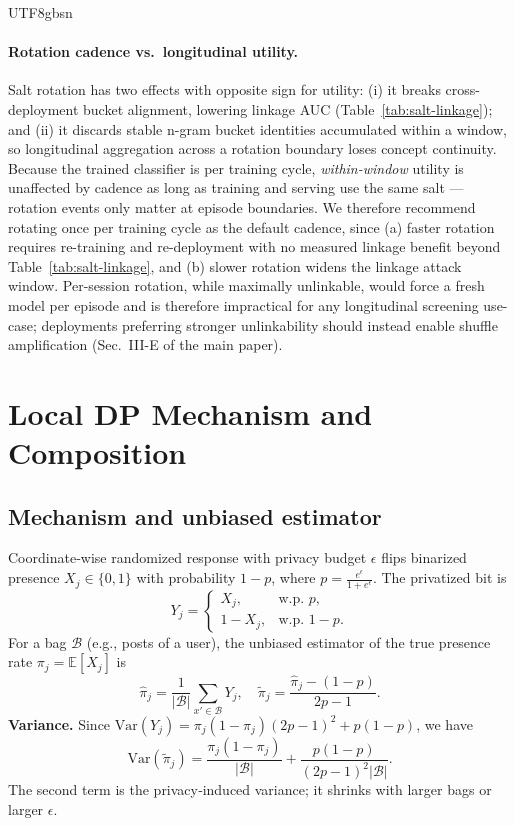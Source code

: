 \documentclass[acmsmall,natbib]{acmart}
\begin{document}
\begin{CJK*}{UTF8}{gbsn}
\paragraph{Rotation cadence vs.\ longitudinal utility.}
Salt rotation has two effects with opposite sign for utility: (i) it breaks cross-deployment bucket alignment, lowering linkage AUC (Table~\ref{tab:salt-linkage}); and (ii) it discards stable n-gram bucket identities accumulated within a window, so longitudinal aggregation across a rotation boundary loses concept continuity. Because the trained classifier is per training cycle, \emph{within-window} utility is unaffected by cadence as long as training and serving use the same salt — rotation events only matter at episode boundaries. We therefore recommend rotating once per training cycle as the default cadence, since (a) faster rotation requires re-training and re-deployment with no measured linkage benefit beyond Table~\ref{tab:salt-linkage}, and (b) slower rotation widens the linkage attack window. Per-session rotation, while maximally unlinkable, would force a fresh model per episode and is therefore impractical for any longitudinal screening use-case; deployments preferring stronger unlinkability should instead enable shuffle amplification (Sec.~III-E of the main paper).


\section{Local DP Mechanism and Composition}
\label{app:ldp}

\subsection{Mechanism and unbiased estimator}
Coordinate‑wise randomized response with privacy budget $\epsilon$ flips binarized presence $X_j \in \{0,1\}$ with probability $1-p$, where $p=\frac{e^{\epsilon}}{1+e^{\epsilon}}$. The privatized bit is
\[
Y_j=\begin{cases}
X_j,& \text{w.p. } p,\\
1-X_j,& \text{w.p. } 1-p.
\end{cases}
\]
For a bag $\mathcal{B}$ (e.g., posts of a user), the unbiased estimator of the true presence rate $\pi_j{=}\mathbb{E}[X_j]$ is
\[
\hat{\pi}_j=\frac{1}{|\mathcal{B}|}\sum_{x'\in\mathcal{B}}Y_j,\quad
\tilde{\pi}_j=\frac{\hat{\pi}_j-(1-p)}{2p-1}.
\]
\textbf{Variance.} Since $\text{Var}(Y_j)=\pi_j(1-\pi_j)(2p-1)^2 + p(1-p)$, we have
\[
\text{Var}(\tilde{\pi}_j)=\frac{\pi_j(1-\pi_j)}{|\mathcal{B}|} + \frac{p(1-p)}{(2p-1)^2 |\mathcal{B}|}.
\]
The second term is the privacy‑induced variance; it shrinks with larger bags or larger $\epsilon$.


\end{CJK*}
\end{document}
